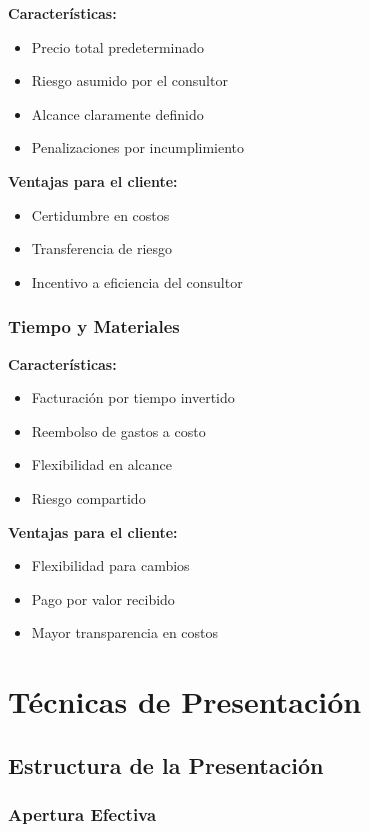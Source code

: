 \documentclass[12pt,letterpaper,oneside]{book}
\begin{document}
\textbf{Características:}
\begin{itemize}
\item Precio total predeterminado
\item Riesgo asumido por el consultor
\item Alcance claramente definido
\item Penalizaciones por incumplimiento
\end{itemize}

\textbf{Ventajas para el cliente:}
\begin{itemize}
\item Certidumbre en costos
\item Transferencia de riesgo
\item Incentivo a eficiencia del consultor
\end{itemize}

\subsubsection{Tiempo y Materiales}

\textbf{Características:}
\begin{itemize}
\item Facturación por tiempo invertido
\item Reembolso de gastos a costo
\item Flexibilidad en alcance
\item Riesgo compartido
\end{itemize}

\textbf{Ventajas para el cliente:}
\begin{itemize}
\item Flexibilidad para cambios
\item Pago por valor recibido
\item Mayor transparencia en costos
\end{itemize}

\section{Técnicas de Presentación}

\subsection{Estructura de la Presentación}

\subsubsection{Apertura Efectiva}
\end{document}
